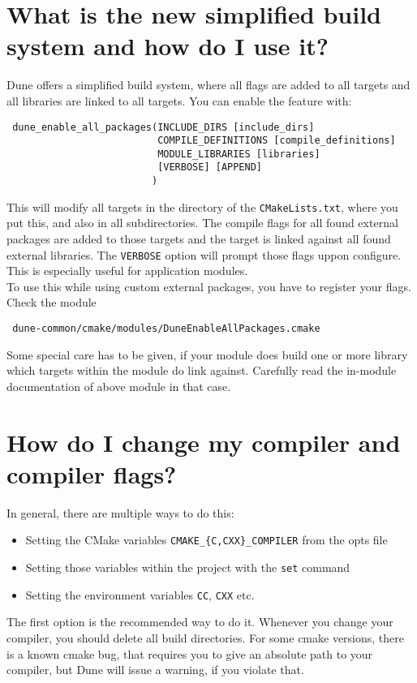 \documentclass[a4paper,10pt]{scrartcl}
\begin{document}
\section{What is the new simplified build system and how do I use it?}
\label{simplified}
Dune offers a simplified build system, where all flags are added to all targets and all libraries are linked to all targets. You can enable the feature with:
\begin{lstlisting}
 dune_enable_all_packages(INCLUDE_DIRS [include_dirs]
                          COMPILE_DEFINITIONS [compile_definitions]
                          MODULE_LIBRARIES [libraries]
                          [VERBOSE] [APPEND]
                         )
\end{lstlisting}
This will modify all targets in the directory of the \lstinline!CMakeLists.txt!, where you put this, and also in all subdirectories. The compile flags for all found external packages are added to those targets and the target is linked against all found external libraries. The \lstinline!VERBOSE! option will prompt those flags uppon configure. This is especially useful for application modules.\\

To use this while using custom external packages, you have to register your flags. Check the module
\begin{lstlisting}
 dune-common/cmake/modules/DuneEnableAllPackages.cmake
\end{lstlisting}

Some special care has to be given, if your module does build one or more library which targets within the module do link against. Carefully read the in-module documentation of above module in that case.

\section{How do I change my compiler and compiler flags?}
\label{compiler}
In general, there are multiple ways to do this:
\begin{itemize}
 \item Setting the CMake variables \verb!CMAKE_{C,CXX}_COMPILER! from the opts file
 \item Setting those variables within the project with the \verb!set! command
 \item Setting the environment variables \verb!CC!, \verb!CXX! etc.
\end{itemize}

The first option is the recommended way to do it. Whenever you change your compiler, you should delete all build directories. For some cmake versions, there is a known cmake bug, that requires you to give an absolute path to your compiler, but Dune will issue a warning, if you violate that. \\
\end{document}
